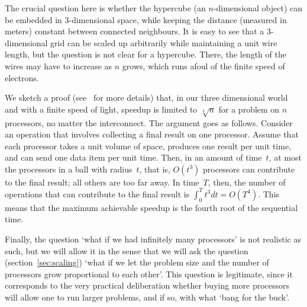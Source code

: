 The crucial question here is whether the hypercube (an $n$-dimensional
object) can be embedded in 3-dimensional space, while keeping the
distance (measured in meters) constant between connected neighbours.
It is easy to see that a 3-dimensional grid can be scaled up
arbitrarily while maintaining a unit wire length, but the question is
not clear for a hypercube.  There, the length of the wires may have to
increase as $n$ grows, which runs afoul of the finite speed of
electrons.

We sketch a proof (see~\cite{Fisher:fastparallel} for more details)
that, in our three dimensional world and with a finite speed of light,
speedup is limited to $\sqrt[4]{n}$ for a problem on $n$ processors,
no matter the interconnect. The argument goes as follows. Consider an
operation that involves collecting a final result on one processor. Assume
that each processor takes a unit volume of space, produces one result
per unit time, and can send one data item per unit time. Then, in an
amount of time~$t$, at most the processors in a ball with radius~$t$,
that is, $O(t^3)$ processors can contribute to the
final result; all others are too far away. In time~$T$, then, the
number of operations 
that can contribute to the final result is $\int_0^T
t^3dt=O(T^4)$. This means that the maximum achievable speedup is the
fourth root of the sequential time.

Finally, the question `what if we had infinitely many processors' is
not realistic as such, but we will allow it in the sense that we will
ask the  question (section~\ref{sec:scaling})
`what if we let the problem size and the number of processors grow
proportional to each other'. This question is legitimate, since it
corresponds to the very practical deliberation whether buying more
processors will allow one to run larger problems, and if so, with what
`bang for the buck'.

